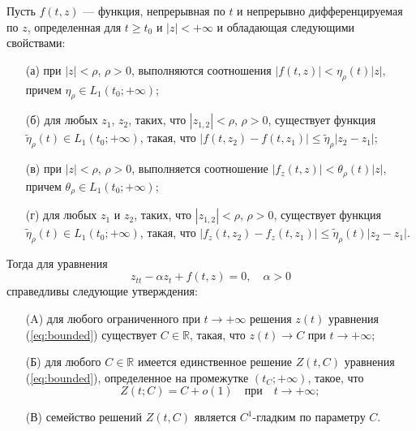 \begin{lemma}
Пусть $f(t, z)$ --- функция, непрерывная по $t$ и непрерывно дифференцируемая по $z$, определенная для $t \ge t_0$ и $|z| < +\infty$ и обладающая следующими свойствами:
%
\begin{itemize}
\item[(а)] при $|z| < \rho$, $\rho > 0$, выполняются соотношения $|f(t,z)| < \eta_{\rho}(t)|z|$, причем $\eta_{\rho} \in L_1(t_0; +\infty)$;
\item[(б)] для любых $z_1$, $z_2$, таких, что $|z_{1,2}| < \rho$, $\rho > 0$, существует функция $\tilde{\eta}_{\rho}(t) \in L_1(t_0; +\infty)$, такая, что $|f(t, z_2) - f(t, z_1)| \le \tilde{\eta}_{\rho} |z_2 - z_1|$;
\item[(в)] при $|z| < \rho$, $\rho > 0$, выполняется соотношение $|f_z(t,z)| < \theta_{\rho}(t)|z|$, причем $\theta_{\rho} \in L_1(t_0; +\infty)$;
\item[(г)] для любых $z_1$ и $z_2$, таких, что $|z_{1,2}| < \rho$, $\rho > 0$, существует функция $\tilde{\eta}_{\rho}(t) \in L_1(t_0; +\infty)$, такая, что $|f_z(t, z_2) - f_z(t, z_1)| \le \tilde{\eta}_{\rho}(t) |z_2 - z_1|$.
\end{itemize}
%
Тогда для уравнения
%
\begin{equation}
z_{tt} - \alpha z_t + f(t,z) = 0, \quad \alpha > 0
\label{eq:bounded}
\end{equation}
%
справедливы следующие утверждения:
%
\begin{itemize}
\item[(A)] для любого ограниченного при $t \to +\infty$ решения $z(t)$ уравнения (\ref{eq:bounded}) существует $C \in \mathbb{R}$, такая, что $z(t) \to C$ при $t \to +\infty$;
\item[(Б)] для любого $C \in \mathbb{R}$ имеется единственное решение $Z(t, C)$ уравнения (\ref{eq:bounded}), определенное на промежутке $(t_C; +\infty)$, такое, что
%
\begin{equation}
Z(t;C)=C+o(1)\quad \mbox{при} \quad t \to +\infty;
\label{eq:bounded_asympt}
\end{equation}
%
\item[(В)] семейство решений $Z(t, C)$ является $C^1$-гладким по параметру $C$.
\end{itemize}
%
\label{lemma:bounded}
\end{lemma}
%
